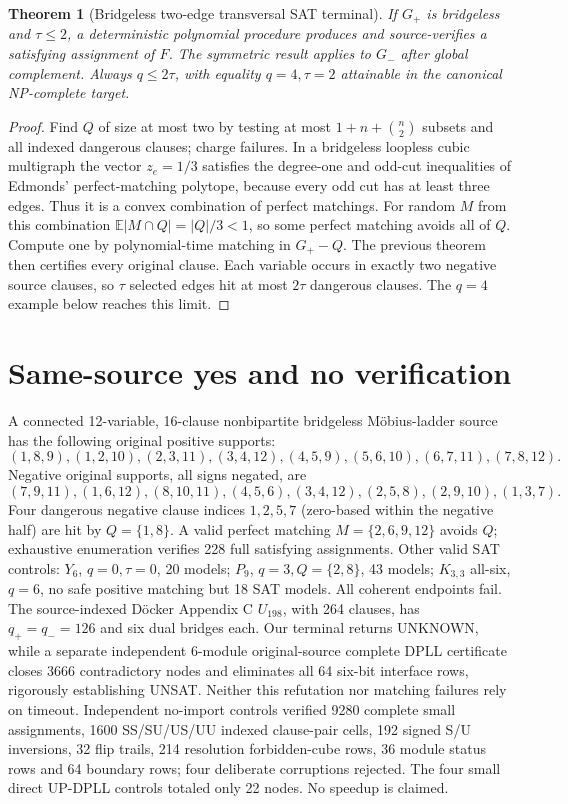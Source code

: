 \documentclass[11pt]{article}
\newtheorem{theorem}{Theorem}
\begin{document}
\begin{theorem}[Bridgeless two-edge transversal SAT terminal]
If $G_+$ is bridgeless and $\tau\le2$, a deterministic polynomial procedure produces and source-verifies a satisfying assignment of $F$. The symmetric result applies to $G_-$ after global complement. Always $q\le2\tau$, with equality $q=4,\tau=2$ attainable in the canonical NP-complete target.
\end{theorem}
\begin{proof}
Find $Q$ of size at most two by testing at most $1+n+\binom n2$ subsets and all indexed dangerous clauses; charge failures. In a bridgeless loopless cubic multigraph the vector $z_e=1/3$ satisfies the degree-one and odd-cut inequalities of Edmonds' perfect-matching polytope, because every odd cut has at least three edges. Thus it is a convex combination of perfect matchings. For random $M$ from this combination $\mathbb E|M\cap Q|=|Q|/3<1$, so some perfect matching avoids all of $Q$. Compute one by polynomial-time matching in $G_+-Q$. The previous theorem then certifies every original clause. Each variable occurs in exactly two negative source clauses, so $\tau$ selected edges hit at most $2\tau$ dangerous clauses. The $q=4$ example below reaches this limit.
\end{proof}
\section{Same-source yes and no verification}
A connected 12-variable, 16-clause nonbipartite bridgeless M\"obius-ladder source has the following original positive supports:
\[
(1,8,9),(1,2,10),(2,3,11),(3,4,12),(4,5,9),(5,6,10),(6,7,11),(7,8,12).
\]
Negative original supports, all signs negated, are
\[
(7,9,11),(1,6,12),(8,10,11),(4,5,6),(3,4,12),(2,5,8),(2,9,10),(1,3,7).
\]
Four dangerous negative clause indices $1,2,5,7$ (zero-based within the negative half) are hit by $Q=\{1,8\}$. A valid perfect matching $M=\{2,6,9,12\}$ avoids $Q$; exhaustive enumeration verifies 228 full satisfying assignments. Other valid SAT controls: $Y_6$, $q=0,\tau=0$, 20 models; $P_9$, $q=3,Q=\{2,8\}$, 43 models; $K_{3,3}$ all-six, $q=6$, no safe positive matching but 18 SAT models. All coherent endpoints fail. The source-indexed Döcker Appendix C $U_{198}$, with 264 clauses, has $q_+=q_-=126$ and six dual bridges each. Our terminal returns UNKNOWN, while a separate independent 6-module original-source complete DPLL certificate closes 3666 contradictory nodes and eliminates all 64 six-bit interface rows, rigorously establishing UNSAT. Neither this refutation nor matching failures rely on timeout.
Independent no-import controls verified 9280 complete small assignments, 1600 SS/SU/US/UU indexed clause-pair cells, 192 signed S/U inversions, 32 flip trails, 214 resolution forbidden-cube rows, 36 module status rows and 64 boundary rows; four deliberate corruptions rejected. The four small direct UP-DPLL controls totaled only 22 nodes. No speedup is claimed.
\end{document}
